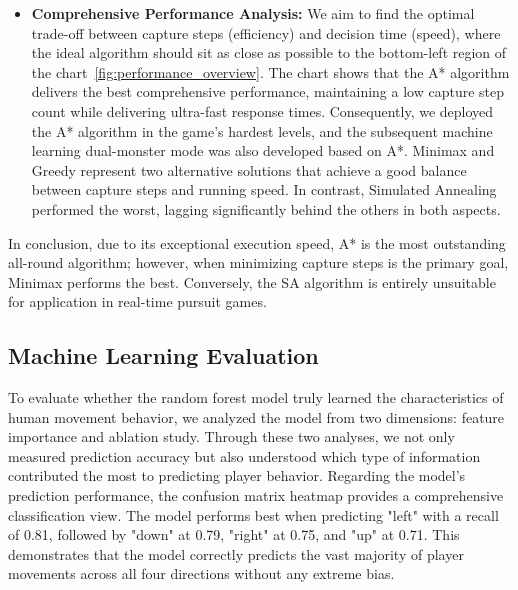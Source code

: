 \documentclass[12pt,a4paper]{article}
\begin{document}
\begin{itemize}
Considering that our game is a real-time interactive system, the AI must not only possess strong pursuit capabilities but also guarantee sufficient response speed. A* achieved the fastest decision speed, requiring an average of only 0.0511 milliseconds per decision. From an operational efficiency standpoint, it is the most outstanding among the four algorithms. Greedy's average decision time was 0.3449 milliseconds; although slightly slower than A*, it remains highly efficient. Minimax recorded an average decision time of 0.6211 milliseconds. Compared to A* and Greedy, its execution speed is slower, but the reason is evident: Minimax needs to search future possible game states before making a decision. SA performed poorly, with an average decision time as high as 9.9962 milliseconds, far exceeding the other three algorithms.
    
    \item \textbf{Comprehensive Performance Analysis:} We aim to find the optimal trade-off between capture steps (efficiency) and decision time (speed), where the ideal algorithm should sit as close as possible to the bottom-left region of the chart~\ref{fig:performance_overview}. The chart shows that the A* algorithm delivers the best comprehensive performance, maintaining a low capture step count while delivering ultra-fast response times. Consequently, we deployed the A* algorithm in the game's hardest levels, and the subsequent machine learning dual-monster mode was also developed based on A*. Minimax and Greedy represent two alternative solutions that achieve a good balance between capture steps and running speed. In contrast, Simulated Annealing performed the worst, lagging significantly behind the others in both aspects.
\end{itemize}

In conclusion, due to its exceptional execution speed, A* is the most outstanding all-round algorithm; however, when minimizing capture steps is the primary goal, Minimax performs the best. Conversely, the SA algorithm is entirely unsuitable for application in real-time pursuit games.


\subsection{Machine Learning Evaluation}

To evaluate whether the random forest model truly learned the characteristics of human movement behavior, we analyzed the model from two dimensions: feature importance and ablation study. Through these two analyses, we not only measured prediction accuracy but also understood which type of information contributed the most to predicting player behavior. Regarding the model's prediction performance, the confusion matrix heatmap provides a comprehensive classification view. The model performs best when predicting "left" with a recall of 0.81, followed by "down" at 0.79, "right" at 0.75, and "up" at 0.71. This demonstrates that the model correctly predicts the vast majority of player movements across all four directions without any extreme bias.
\end{document}
